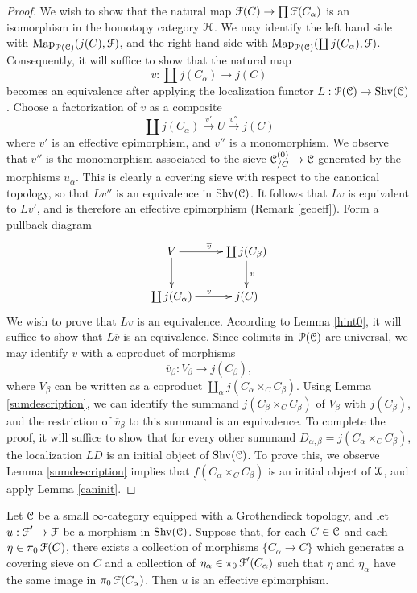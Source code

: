 \begin{proof}
We wish to show that the natural map $\operatorname{\mathcal{F}}(C) \rightarrow \prod \operatorname{\mathcal{F}}(C_{\alpha} )$ is an isomorphism in the homotopy category $\operatorname{\mathcal{H}}$. We may identify the left hand side with
$\operatorname{{Map}}_{\operatorname{\mathcal{P}}(\operatorname{\mathcal{C}})}( j(C), \operatorname{\mathcal{F}})$, and the right hand side with
$\operatorname{{Map}}_{\operatorname{\mathcal{P}}(\operatorname{\mathcal{C}})}( \coprod j(C_{\alpha}), \operatorname{\mathcal{F}})$. Consequently, it will suffice to show that the natural map
$$ v: \coprod j(C_{\alpha}) \rightarrow j(C)$$
becomes an equivalence after applying the localization functor $L: \operatorname{\mathcal{P}}(\operatorname{\mathcal{C}}) \rightarrow \operatorname{Shv}(\operatorname{\mathcal{C}})$. Choose a factorization of $v$ as a composite
$$ \coprod j(C_{\alpha}) \stackrel{v'}{\rightarrow} U \stackrel{v''}{\rightarrow} j(C)$$
where $v'$ is an effective epimorphism, and $v''$ is a monomorphism. We observe that 
$v''$ is the monomorphism associated to the
sieve $\operatorname{\mathcal{C}}^{(0)}_{/C} \rightarrow \operatorname{\mathcal{C}}$ generated by the morphisms $u_{\alpha}$.
This is clearly a covering sieve with respect to the canonical topology, so that $Lv''$
is an equivalence in $\operatorname{Shv}(\operatorname{\mathcal{C}})$. It follows that $Lv$ is equivalent to $Lv'$, and is therefore an effective epimorphism (Remark \ref{geoeff}). 
Form a pullback diagram
$$ \xymatrix{ V \ar[r]^{\overline{v}} \ar[d] & \coprod j(C_{\beta}) \ar[d]^{v} \\
\coprod j(C_{\alpha}) \ar[r]^{v} & j(C) }$$
We wish to prove that $Lv$ is an equivalence. According to Lemma \ref{hint0}, it will suffice
to show that $L \overline{v}$ is an equivalence. Since colimits in $\operatorname{\mathcal{P}}(\operatorname{\mathcal{C}})$ are universal, we may identify $\overline{v}$ with a coproduct of morphisms 
$$\overline{v}_{\beta}: V_{\beta} \rightarrow j(C_{\beta}),$$ 
where $V_{\beta}$ can be written as a coproduct $\coprod_{\alpha} j( C_{\alpha} \times_{C} C_{\beta})$. Using Lemma \ref{sumdescription}, we can identify the summand
$ j( C_{\beta} \times_{C} C_{\beta})$ of $V_{\beta}$ with $j(C_{\beta})$, and the restriction
of $\overline{v}_{\beta}$ to this summand is an equivalence. To complete the proof, it will suffice to show that for every other summand $D_{\alpha, \beta} = j( C_{\alpha} \times_{C} C_{\beta} )$,
the localization $LD$ is an initial object of $\operatorname{Shv}(\operatorname{\mathcal{C}})$. To prove this, we observe Lemma \ref{sumdescription} implies that $f( C_{\alpha} \times_{C} C_{\beta} )$ is an initial object
of $\operatorname{\mathcal{X}}$, and apply Lemma \ref{caninit}.
\end{proof}


\begin{lemma}\label{charepii}
Let $\operatorname{\mathcal{C}}$ be a small $\infty$-category equipped with a Grothendieck topology, and let
$u: \operatorname{\mathcal{F}}' \rightarrow \operatorname{\mathcal{F}}$ be a morphism in $\operatorname{Shv}(\operatorname{\mathcal{C}})$. Suppose that, for each
$C \in \operatorname{\mathcal{C}}$ and each $\eta \in \pi_0 \operatorname{\mathcal{F}}(C)$, there exists a collection of morphisms
$\{ C_{\alpha} \rightarrow C \}$ which generates a covering sieve on $C$ and
a collection of $\eta_{\alpha} \in \pi_0 \operatorname{\mathcal{F}}'(C_{\alpha})$ such that $\eta$ and
$\eta_{\alpha}$ have the same image in $\pi_0 \operatorname{\mathcal{F}}(C_{\alpha})$. Then $u$ is an effective epimorphism.
\end{lemma}


